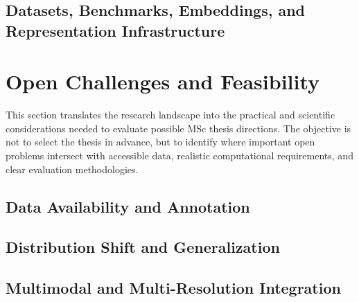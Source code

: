 \documentclass[11pt,a4paper]{article}
\begin{document}
\subsection{Datasets, Benchmarks, Embeddings, and Representation Infrastructure}


\section{Open Challenges and Feasibility}

This section translates the research landscape into the practical and
scientific considerations needed to evaluate possible MSc thesis
directions. The objective is not to select the thesis in advance, but
to identify where important open problems intersect with accessible
data, realistic computational requirements, and clear evaluation
methodologies.

\subsection{Data Availability and Annotation}


\subsection{Distribution Shift and Generalization}


\subsection{Multimodal and Multi-Resolution Integration}
\end{document}
